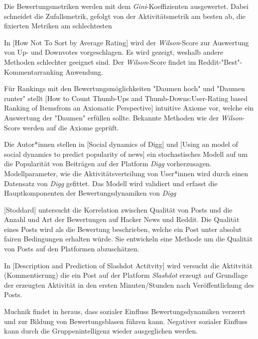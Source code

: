 Die Bewertungsmetriken werden mit dem \textit{Gini}-Koeffizienten ausgewertet. Dabei schneidet die Zufallsmetrik, gefolgt von der Aktivitätsmetrik am besten ab, die fixierten Metriken am schlechtesten



In [How Not To Sort by Average Rating] wird der \textit{Wilson}-Score zur Auswertung von Up- und Downvotes vorgeschlagen. Es wird gezeigt, weshalb andere Methoden schlechter geeignet sind. Der \textit{Wilson}-Score findet im Reddit-"Best"-Kommentarranking Anwendung.

Für Rankings mit den Bewertungsmöglichkeiten "Daumen hoch" und "Daumen runter" stellt [How to Count Thumb-Ups and Thumb-Downs:User-Rating based Ranking of Itemsfrom an Axiomatic Perspective] intuitive Axiome vor, welche ein Auswertung der "Daumen" erfüllen sollte. Bekannte Methoden wie der \textit{Wilson}-Score werden auf die Axiome geprüft. %

Die Autor*innen stellen in [Social dynamics of Digg] und [Using an model of social dynamics to predict popularity of news] ein stochastisches Modell auf um die Popularität von Beiträgen auf der Platform \textit{Digg} vorherzusagen. Modellparameter, wie die Aktivitätsverteilung von User*innen wird durch einen Datensatz von \textit{Digg} gefittet. Das Modell wird validiert und erfasst die Hauptkomponenten der Bewertungsdynamiken von \textit{Digg}

[Stoddard] untersucht die Korrelation zwischen Qualität von Posts und die Anzahl und Art der Bewertungen auf Hacker News und Reddit. Die Qualität eines Posts wird als die Bewertung beschrieben, welche ein Post unter absolut fairen Bedingungen erhalten würde. Sie entwickeln eine Methode um die Qualität von Posts auf den Platformen abzuschätzen.

In [Description and Prediction of Slashdot Actitvity] wird versucht die Aktitvität (Kommentierung) die ein Post auf der Platform \textit{Slashdot} erzeugt auf Grundlage der erzeugten Aktivität in den ersten Minuten/Stunden nach Veröffentlichung des Posts. 

Muchnik findet in \cite{Muchnik2013647} heraus, dass sozialer Einfluss Bewertungsdynamiken verzerrt und zur Bildung von Bewertungsblasen führen kann.
Negativer sozialer Einfluss kann durch die Gruppenintelligenz wieder ausgeglichen werden.


